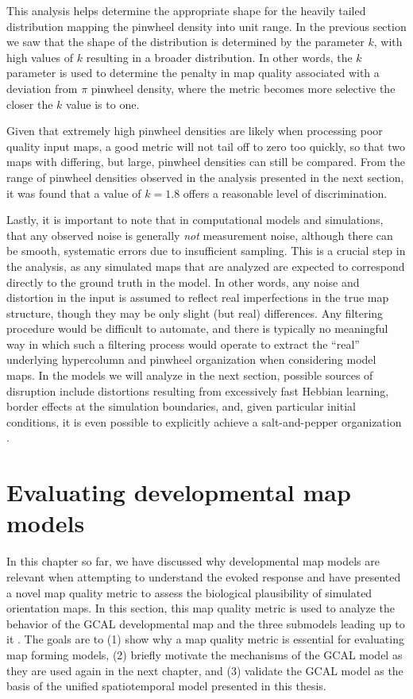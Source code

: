 \documentclass[phd,ianc,twoside]{infthesis}
\begin{document}
This analysis helps determine the appropriate shape for the
heavily tailed distribution mapping the pinwheel density into unit
range. In the previous section we saw that the shape of the distribution
is determined by the parameter $k$, with high values of $k$ resulting in
a broader distribution. In other words, the $k$ parameter is used to
determine the penalty in map quality associated with a deviation from
$\pi$ pinwheel density, where the metric becomes more selective the
closer the $k$ value is to one.

Given that extremely high pinwheel densities are likely when processing
poor quality input maps, a good metric will not tail off to zero too
quickly, so that two maps with differing, but large, pinwheel densities
can still be compared. From the range of pinwheel densities observed in
the analysis presented in the next section, it was found that a value of
$k=1.8$ offers a reasonable level of discrimination.

Lastly, it is important to note that in computational models and
simulations, that any observed noise is generally \emph{not} measurement
noise, although there can be smooth, systematic errors due to
insufficient sampling. This is a crucial step in the analysis, as any
simulated maps that are analyzed are expected to correspond directly to
the ground truth in the model.  In other words, any noise and distortion
in the input is assumed to reflect real imperfections in the true map
structure, though they may be only slight (but real) differences.  Any
filtering procedure would be difficult to automate, and there is
typically no meaningful way in which such a filtering process would
operate to extract the ``real'' underlying hypercolumn and pinwheel
organization when considering model maps. In the models we will analyze
in the next section, possible sources of disruption include distortions
resulting from excessively fast Hebbian learning, border effects at the
simulation boundaries, and, given particular initial conditions, it is
even possible to explicitly achieve a salt-and-pepper organization
\citep{law_thesis09}.


\section{Evaluating developmental map models}

In this chapter so far, we have discussed why developmental map models
are relevant when attempting to understand the evoked response and have
presented a novel map quality metric to assess the biological
plausibility of simulated orientation maps. In this section, this map
quality metric is used to analyze the behavior of the GCAL developmental
map and the three submodels leading up to it \citep{stevens_jn13}. The
goals are to (1) show why a map quality metric is essential for
evaluating map forming models, (2) briefly motivate the mechanisms of the
GCAL model as they are used again in the next chapter, and (3) validate the
GCAL model as the basis of the unified spatiotemporal model presented in
this thesis.
\end{document}
